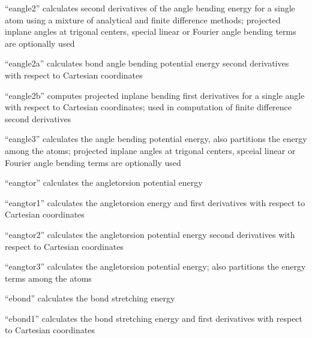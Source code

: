 \documentclass[letterpaper,11pt,english]{sphinxmanual}
\begin{document}

“eangle2” calculates second derivatives of the angle bending
energy for a single atom using a mixture of analytical and
finite difference methods; projected in\sphinxhyphen{}plane angles at trigonal
centers, special linear or Fourier angle bending terms are
optionally used


“eangle2a” calculates bond angle bending potential energy
second derivatives with respect to Cartesian coordinates


“eangle2b” computes projected in\sphinxhyphen{}plane bending first derivatives
for a single angle with respect to Cartesian coordinates;
used in computation of finite difference second derivatives


“eangle3” calculates the angle bending potential energy, also
partitions the energy among the atoms; projected in\sphinxhyphen{}plane
angles at trigonal centers, spceial linear or Fourier angle
bending terms are optionally used


“eangtor” calculates the angle\sphinxhyphen{}torsion potential energy


“eangtor1” calculates the angle\sphinxhyphen{}torsion energy and first
derivatives with respect to Cartesian coordinates


“eangtor2” calculates the angle\sphinxhyphen{}torsion potential energy
second derivatives with respect to Cartesian coordinates


“eangtor3” calculates the angle\sphinxhyphen{}torsion potential energy;
also partitions the energy terms among the atoms


“ebond” calculates the bond stretching energy


“ebond1” calculates the bond stretching energy and
first derivatives with respect to Cartesian coordinates
\end{document}
